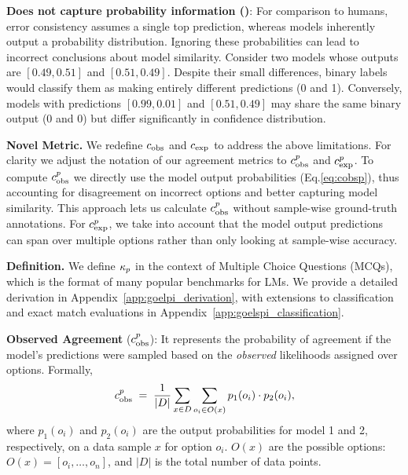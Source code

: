 \textbf{Does not capture probability information ()}: For comparison to humans, error consistency assumes a single top prediction, whereas models inherently output a probability distribution. Ignoring these probabilities can lead to incorrect conclusions about model similarity. Consider two models whose outputs are \([0.49, 0.51]\) and \([0.51, 0.49]\). Despite their small differences, binary labels would classify them as making entirely different predictions (0 and 1). Conversely, models with predictions \([0.99, 0.01]\) and \([0.51, 0.49]\) may share the same binary output (0 and 0) but differ significantly in confidence distribution.

\textbf{Novel Metric.} We redefine $c_{\text{obs}}$ and $c_{\text{exp}}$ to address the above limitations. For clarity we adjust the notation of our agreement metrics to $c_{\text{obs}}^{p}$ and $c_{\text{exp}}^{p}$.
To compute $c_{\text{obs}}^{p}$ we directly use the model output probabilities (Eq.\ref{eq:cobsp}), thus accounting for disagreement on incorrect options and better capturing model similarity. This approach lets us calculate $c_{\text{obs}}^{p}$ without sample-wise ground-truth annotations. For $c_{\text{exp}}^{p}$, we take into account that the model output predictions can span over multiple options rather than only looking at sample-wise accuracy. 

\textbf{Definition.} We define $\kappa_{p}$ in the context of Multiple Choice Questions (MCQs), which is the format of many popular benchmarks for LMs. We provide a detailed derivation in Appendix~\ref{app:goelpi_derivation}, with extensions to classification and exact match evaluations in Appendix~\ref{app:goelspi_classification}.

    \textbf{Observed Agreement} ($c_{\text{obs}}^{p}$): It represents the probability of agreement if the model's predictions were sampled based on the \textit{observed} likelihoods assigned over options. Formally, \vspace{-0.2cm}
    \begin{equation}
    c_{\text{obs}}^{p} \;=\; \frac{1}{|D|} \sum_{x \in D} \sum_{o_i \in O(x)} p_1(o_i) \cdot p_2(o_i),
    \label{eq:cobsp}
    \end{equation}
    where $p_1(o_i)$ and $p_2(o_i)$  are the output probabilities for model 1 and 2, respectively, on a data sample $x$ for option $o_i$. $O(x)$ are the possible options: $O(x) = [o_i , \dots, o_n]$, and $|D|$ is the total number of data points.
    
